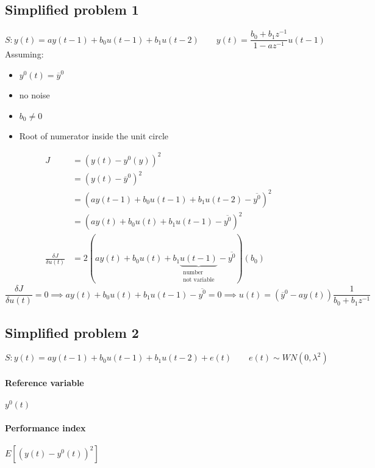 \documentclass{article}
\begin{document}
\subsection{Simplified problem 1}
\[
S:y(t)=ay(t-1)+b_0u(t-1)+b_1u(t-2)
\qquad
y(t)=\frac{b_0+b_1z^{-1}}{1-az^{-1}}u(t-1)
\]
Assuming:
\begin{itemize}
\item $y^0(t)=\overline{y}^0$
\item no noise
\item $b_0\neq 0$
\item Root of numerator inside the unit circle
\end{itemize}
\begin{align*}
J&=\left(y(t)-y^0(y)\right)^2\\
&=\left(y(t)-\overline{y}^0\right)^2\\
&=\left(ay(t-1)+b_0u(t-1)+b_1u(t-2)-\overline{y^0}\right)^2\\
&=\left(ay(t)+b_0u(t)+b_1u(t-1)-\overline{y^0}\right)^2\\
\frac{\delta J}{\delta u(t)}&=2\left(ay(t)+b_0u(t)+b_1\underbrace{u(t-1)}_{\substack{\text{number}\\\text{not variable}}}-\overline{y^0}\right)(b_0)
\end{align*}
\[
\frac{\delta J}{\delta u(t)}=0
\implies
ay(t)+b_0u(t)+b_1u(t-1)-\overline{y^0}=0
\implies
u(t)=(\overline{y}^0-ay(t))\frac{1}{b_0+b_1z^{-1}}
\]
\subsection{Simplified problem 2}
\[
S:y(t)=ay(t-1)+b_0u(t-1)+b_1u(t-2)+e(t)
\qquad
e(t)\sim WN(0,\lambda^2)
\]
\paragraph{Reference variable} $y^0(t)$
\paragraph{Performance index} $E\left[(y(t)-y^0(t))^2\right]$
\end{document}
